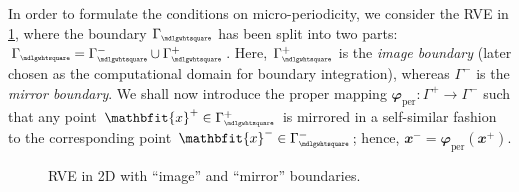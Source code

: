 \documentclass[12pt,a4paper]{article}
\renewcommand{\ta}[1]{\mathbfit{#1}}
\renewcommand{\Box}{\mdlgwhtsquare}
\newcommand{\per}{\mathrm{per}}
\newcommand{\rve}{
  {\mathchoice
   {\mbox{\scalebox{0.67}{$\Box$}}}
   {\mbox{\scalebox{0.67}{$\Box$}}}
   {\mbox{\scalebox{0.5}{$\Box$}}}
   {\mbox{\scalebox{0.375}{$\Box$}}}
  }
}
\begin{document}
In order to formulate the conditions on micro-periodicity, we consider the RVE in \cref{Figure2}, where the boundary $\Gamma_\rve$ has been split into two parts: $\Gamma_\rve=\Gamma_\rve^- \cup \Gamma_\rve^+$.
Here, $\Gamma_\rve^+$ is the \emph{image boundary} (later chosen as the computational domain for boundary integration), whereas $\Gamma^-$ is the \emph{mirror boundary}.
We shall now introduce the proper mapping $\ta{\varphi}_\per:\Gamma^+ \rightarrow \Gamma^-$ such that any point $\ta{x}^+\in\Gamma_\rve^+$ is mirrored in a self-similar fashion to the corresponding point $\ta{x}^-\in\Gamma_\rve^-$; hence, $\ta{x}^-=\ta{\varphi}_\per(\ta{x}^+)$.
\begin{figure}[H]
\centering
{}
\caption{RVE in 2D with ``image'' and ``mirror'' boundaries.}
\label{Figure2}
\end{figure}
\end{document}
